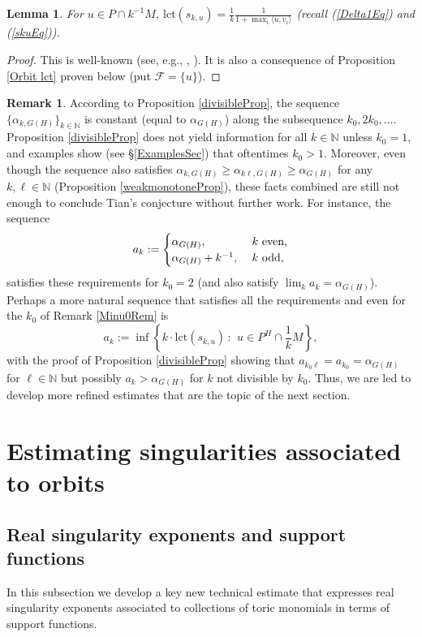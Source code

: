 \documentclass{article}
\newcommand\cF{{\mathcal F}}
\newcommand{\lct}{\mathrm{lct}}
\newcommand{\NN}{{\mathbb N}}
\renewcommand{\>}{\rightarrow}
\theoremstyle{plain}
\newtheorem{lemma}[theorem]{Lemma}
\theoremstyle{definition}
\newtheorem{remark}[theorem]{Remark}
\newcommand{\bpf}{\begin{proof}}
\newcommand{\epf}{\end{proof}}
\newcommand{\bremark}{\begin{remark}}
\newcommand{\eremark}{\end{remark}}
\newcommand{\blem}{\begin{lemma}}
\newcommand{\elem}{\end{lemma}}
\def\lb#1{\label{#1}}
\def\ran{\rangle}
\def\lan{\langle}
\begin{document}
\blem
\lb{AuxOneSecLCTLemma}
For $u\in P\cap k^{-1}M$,
$\displaystyle\lct (s_{k,u})=\frac1k\frac1{1+\max_i\lan u,v_i\ran}$
(recall (\ref{Delta1Eq}) and (\ref{skuEq})).
\elem
\bpf
This is well-known (see, e.g., \cite[Corollary 7.4]{BJ20}, \cite[Theorem 4.1]{LSY15}).
It is also a consequence of Proposition \ref{Orbit lct} proven
below (put $\cF=\{u\}$).
\epf

\bremark
\lb{DivisibleRemark}
According to Proposition \ref{divisibleProp}, the sequence $\{\alpha_{k,{G(H)}}\}_{k\in\NN}$ 
is constant (equal to $\alpha_{G(H)}$) along the subsequence $k_0,2k_0,\ldots$. 
Proposition \ref{divisibleProp} does not yield information for all $k\in\NN$ unless $k_0=1$,
    and examples show (see \S\ref{ExamplesSec}) 
    that oftentimes $k_0>1$. 
Moreover, even though the sequence also satisfies
$\alpha_{k,{G(H)}}\ge \alpha_{k\ell,{G(H)}}\ge \alpha_{G(H)}$ for any $k,\ell\in\NN$
(Proposition \ref{weakmonotoneProp}), these facts combined are
still not enough to conclude Tian's conjecture without further work. 
For instance, the sequence
$$
a_k:=\begin{cases} \alpha_{G(H)}, & \hbox{\ $k$ even,}\cr
\alpha_{G(H)}+k^{-1}, & \hbox{\ $k$ odd,}\cr
\end{cases}
$$
satisfies these requirements for $k_0=2$ (and also satisfy $\lim_ka_k=\alpha_{G(H)}$). 
Perhaps a more natural sequence that satisfies all the requirements
and even for the $k_0$ of Remark \ref{Minu0Rem} is
$$
a_k:=
\inf\left\{k\cdot\lct(s_{k,u})\,:\,~u\in P^H\cap\frac{1}{k}M\right\},
$$      
with the proof of Proposition \ref{divisibleProp} showing that
$a_{k_0\ell}=a_{k_0}=\alpha_{G(H)}$ for $\ell\in\NN$ but possibly $a_k>\alpha_{G(H)}$
for $k$ not divisible by $k_0$.
    Thus, we are led  to develop more refined
    estimates that are the topic of the next section.
\eremark



\section{Estimating singularities associated to orbits}
\lb{OrbitsEstimateSec}

\subsection{Real singularity exponents and support functions}

In this subsection we develop a key new technical estimate 
that expresses real singularity exponents associated to 
collections of toric monomials in terms of support functions.
\end{document}
